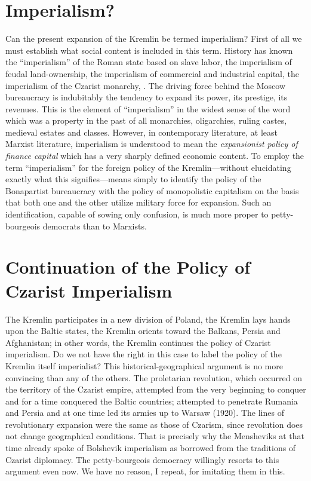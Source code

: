 \section*{Imperialism?}

Can the present expansion of the Kremlin be termed imperialism? First of all we must establish what social content is included in this term. History has known the “imperialism” of the Roman state based on slave labor, the imperialism of feudal land-ownership, the imperialism of commercial and industrial capital, the imperialism of the Czarist monarchy, \etc. The driving force behind the Moscow bureaucracy is indubitably the tendency to expand its power, its prestige, its revenues. This is the element of “imperialism” in the widest sense of the word which was a property in the past of all monarchies, oligarchies, ruling castes, medieval estates and classes. However, in contemporary literature, at least Marxist literature, imperialism is understood to mean the \emph{expansionist policy of finance capital} which has a very sharply defined economic content. To employ the term “imperialism” for the foreign policy of the Kremlin---without elucidating exactly what this signifies---means simply to identify the policy of the Bonapartist bureaucracy with the policy of monopolistic capitalism on the basis that both one and the other utilize military force for expansion. Such an identification, capable of sowing only confusion, is much more proper to petty-bourgeois democrats than to Marxists.

\newpage

\section*{Continuation of the Policy of Czarist Imperialism}

\noindent
The Kremlin participates in a new division of Poland, the Kremlin lays hands upon the Baltic states, the Kremlin orients toward the Balkans, Persia and Afghanistan; in other words, the Kremlin continues the policy of Czarist imperialism. Do we not have the right in this case to label the policy of the Kremlin itself imperialist? This historical-geographical argument is no more convincing than any of the others. The proletarian revolution, which occurred on the territory of the Czarist empire, attempted from the very beginning to conquer and for a time conquered the Baltic countries; attempted to penetrate Rumania and Persia and at one time led its armies up to Warsaw (1920). The lines of revolutionary expansion were the same as those of Czarism, since revolution does not change geographical conditions. That is precisely why the Mensheviks at that time already spoke of Bolshevik imperialism as borrowed from the traditions of Czarist diplomacy. The petty-bourgeois democracy willingly resorts to this argument even now. We have no reason, I repeat, for imitating them in this.

